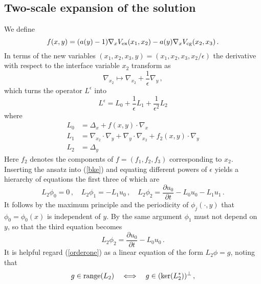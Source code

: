 \documentclass{amsart}
\newcommand{\eps}{\epsilon}
\newcommand{\wrt}{with respect to }
\begin{document}
\subsection{Two-scale expansion of the solution} We define
\begin{equation*}
f(x,y) = (a(y)-1)\nabla_{x}V_{\rm ex}(x_{1},x_{2}) - a(y)\nabla_{x}V_{\rm cg}(x_{2},x_{3})\,.
\end{equation*} 
In terms of the new variables $(x_{1},x_{2},x_{3},y)=(x_{1},x_{2},x_{3},x_{2}/\eps)$ the derivative \wrt the interface variable $x_{2}$ transform as 
\begin{equation*}
\nabla_{x_{2}} \mapsto \nabla_{x_{2}} + \frac{1}{\eps}\nabla_{y}\,,
\end{equation*}
which turns the operator $L^{\eps}$ into
\begin{equation*}
L^{\eps} = L_{0} + \frac{1}{\eps}L_{1} + \frac{1}{\eps^{2}}L_{2}
\end{equation*}
where 
\begin{equation*}
\begin{aligned}
L_{0} & = \Delta_{x} + f(x,y)\cdot\nabla_{x}\\
L_{1} & = \nabla_{x_{2}}\cdot\nabla_{y}  + \nabla_{y}\cdot \nabla_{x_{2}}+ f_{2}(x,y)\cdot\nabla_{y}\\
L_{2} & = \Delta_{y}
\end{aligned}
\end{equation*}
Here $f_{2}$ denotes the components of $f=(f_{1},f_{2},f_{3})$ corresponding to $x_{2}$. Inserting the ansatz into (\ref{bke}) and equating different powers of $\eps$ yields a hierarchy of equations the first three of which are
\begin{equation*}
L_{2} \phi_{0} = 0\,,\quad L_{2} \phi_{1} = -L_{1}u_{0}\,,\quad L_{2} \phi_{2} = \frac{\partial u_{0}}{\partial t} - L_{0}u_{0} - L_{1}u_{1}\,.
\end{equation*}
It follows by the maximum principle and the periodicity of $\phi_{j}(\cdot,y)$ that $\phi_{0}=\phi_{0}(x)$ is independent of $y$. By the same argument $\phi_{1}$ must not depend on $y$, so that the third equation becomes
\begin{equation}\label{orderone}
L_{2} \phi_{2} = \frac{\partial u_{0}}{\partial t} - L_{0}u_{0}\,.
\end{equation}
It is helpful regard (\ref{orderone}) as a linear equation of the form $L_{2}\phi=g$, noting that 
\begin{equation*}
g \in {\rm range}(L_{2})\quad\Longleftrightarrow\quad g \in ({\rm ker}(L^{*}_{2}))^{\perp} \,,
\end{equation*}
\end{document}
